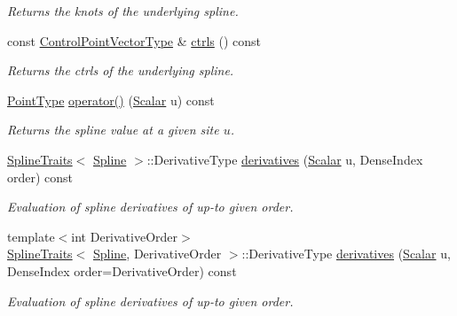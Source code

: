 \begin{DoxyCompactItemize}
\begin{DoxyCompactList}\small\item\em Returns the knots of the underlying spline. \end{DoxyCompactList}\item 
\mbox{\label{group___splines___module_a0fc81e475d3a0ba34da1bd97f2e8fbc7}} 
const \hyperlink{group___splines___module_ac42c673462a98ad1779761bebeb450bf}{Control\+Point\+Vector\+Type} \& \hyperlink{group___splines___module_a0fc81e475d3a0ba34da1bd97f2e8fbc7}{ctrls} () const
\begin{DoxyCompactList}\small\item\em Returns the ctrls of the underlying spline. \end{DoxyCompactList}\item 
\hyperlink{group___splines___module_a9ade8a2f81dae6eedb8845cb080672bd}{Point\+Type} \hyperlink{group___splines___module_a3c7e1838eae4ee7e341ef9d3dbf9ba45}{operator()} (\hyperlink{group___splines___module_a8cafd78b564825c76fbb3419653d9742}{Scalar} u) const
\begin{DoxyCompactList}\small\item\em Returns the spline value at a given site $u$. \end{DoxyCompactList}\item 
\hyperlink{struct_eigen_1_1_spline_traits}{Spline\+Traits}$<$ \hyperlink{group___splines___module_class_eigen_1_1_spline}{Spline} $>$\+::Derivative\+Type \hyperlink{group___splines___module_a196730cf190dfa16907db888277e5aed}{derivatives} (\hyperlink{group___splines___module_a8cafd78b564825c76fbb3419653d9742}{Scalar} u, Dense\+Index order) const
\begin{DoxyCompactList}\small\item\em Evaluation of spline derivatives of up-\/to given order. \end{DoxyCompactList}\item 
{\footnotesize template$<$int Derivative\+Order$>$ }\\\hyperlink{struct_eigen_1_1_spline_traits}{Spline\+Traits}$<$ \hyperlink{group___splines___module_class_eigen_1_1_spline}{Spline}, Derivative\+Order $>$\+::Derivative\+Type \hyperlink{group___splines___module_a50bcf6c99a95ecab7c475f3ab503ee22}{derivatives} (\hyperlink{group___splines___module_a8cafd78b564825c76fbb3419653d9742}{Scalar} u, Dense\+Index order=Derivative\+Order) const
\begin{DoxyCompactList}\small\item\em Evaluation of spline derivatives of up-\/to given order. \end{DoxyCompactList}\item 

\end{DoxyCompactItemize}
